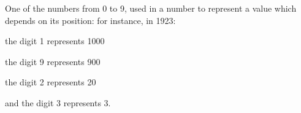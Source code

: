 One of the numbers from 0 to 9, used in a number to represent
a value which depends on its position: for instance, in
1923:
\par
the digit 1 represents 1000
\par
the digit 9 represents 900
\par
the digit 2 represents 20
\par
and the digit 3 represents 3.